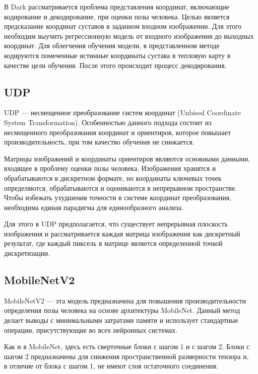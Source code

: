 В Dark рассматривается проблема представления координат, включающие кодирование и декодирование, при оценки позы человека. Целью является предсказание координат суставов в заданном входном изображении. Для этого необходим выучить регрессионную модель от входного изображения до выходных координат. Для облегчения обучения модели, в представленном методе кодируются помеченные истинные координаты сустава в тепловую карту в качестве цели обучения. После этого происходит процесс декодирования.

\subsection{UDP}

UDP \cite{huang2020aid} --- несмещенное преобразование систем координат (Unbised Coordinate System Transformation). Особенностью данного подхода состоит из несмещенного преобразования координат и ориентиров, которое повышает производительность, при том качество обучения не снижается. 

Матрицы изображений и координаты ориентиров являются основными данными, входящее в проблему оценки позы человека. Изображения хранятся и обрабатываются в дискретном формате, но координаты ключевых точек определяются, обрабатываются и оцениваются в непрерывном пространстве. Чтобы избежать ухудшения точности в системе координат преобразования, необходима единая парадигма для единообразного анализа. 

Для этого в UDP предполагается, что существует непрерывная плоскость изображения и рассматривается каждая матрица изображения как дискретный результат, где каждый пиксель в матрице является определенной точкой дискретизации.

\subsection{MobileNetV2}

MobileNetV2 \cite{MobileNetV2} --- эта модель предназначена для повышения производительности определения позы человека на основе архитектуры MobileNet. Данный метод делает выводы с минимальными затратами памяти и использует стандартные операции, присутствующие во всех нейронных системах.

Как и в MobileNet, здесь есть сверточные блоки с шагом 1 и с шагом 2. Блоки с шагом 2 предназначены для снижения пространственной размерности тензора и, в отличие от блока с шагом 1, не имеют слоя остаточного соединения.

